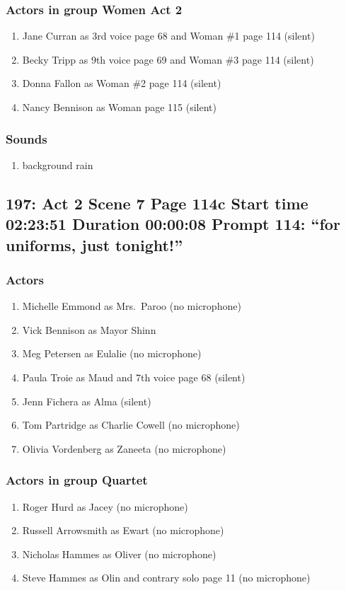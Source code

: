 \subsubsection{Actors in group Women Act 2}
\begin{enumerate}
\item Jane Curran as 3rd voice page 68 and Woman \#1 page 114 (silent)
\item Becky Tripp as 9th voice page 69 and Woman \#3 page 114 (silent)
\item Donna Fallon as Woman \#2 page 114 (silent)
\item Nancy Bennison as Woman page 115 (silent)
\end{enumerate}

\subsubsection{Sounds}
\begin{enumerate}
\item background rain
\end{enumerate}
\subsection{197: Act 2 Scene 7 Page 114c Start time 02:23:51 Duration 00:00:08 Prompt 114: ``for uniforms, just tonight!''}

\subsubsection{Actors}
\begin{enumerate}
\item Michelle Emmond as Mrs.~Paroo (no microphone)
\item Vick Bennison as Mayor Shinn
\item Meg Petersen as Eulalie (no microphone)
\item Paula Troie as Maud and 7th voice page 68 (silent)
\item Jenn Fichera as Alma (silent)
\item Tom Partridge as Charlie Cowell (no microphone)
\item Olivia Vordenberg as Zaneeta (no microphone)
\end{enumerate}
\subsubsection{Actors in group Quartet}
\begin{enumerate}
\item Roger Hurd as Jacey (no microphone)
\item Russell Arrowsmith as Ewart (no microphone)
\item Nicholas Hammes as Oliver (no microphone)
\item Steve Hammes as Olin and contrary solo page 11 (no microphone)
\end{enumerate}
